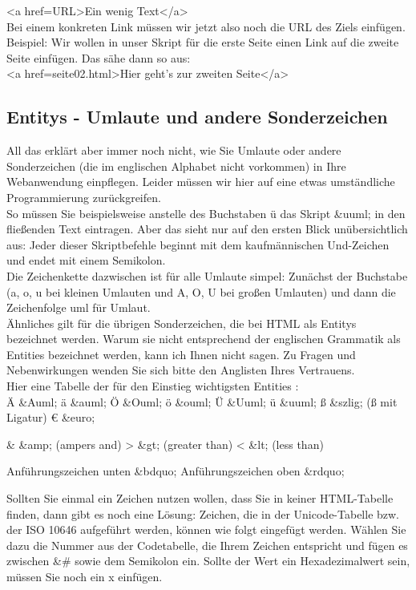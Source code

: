 <a href=URL>Ein wenig Text</a>\\

Bei einem konkreten Link müssen wir jetzt also noch die URL des Ziels einfügen.
Beispiel: Wir wollen in unser Skript für die erste Seite einen Link auf die zweite Seite einfügen. Das sähe dann so aus:\\

<a href=seite02.html>Hier geht’s zur zweiten Seite</a>

\subsection{Entitys - Umlaute und andere Sonderzeichen}

All das erklärt aber immer noch nicht, wie Sie Umlaute oder andere Sonderzeichen (die im englischen Alphabet nicht vorkommen) in Ihre Webanwendung einpflegen. Leider müssen wir hier auf eine etwas umständliche Programmierung zurückgreifen.\\

So müssen Sie beispielsweise anstelle des Buchstaben ü das Skript \&uuml; in den fließenden Text eintragen. Aber das sieht nur auf den ersten Blick unübersichtlich aus: Jeder dieser Skriptbefehle beginnt mit dem kaufmännischen Und-Zeichen und endet mit einem Semikolon.\\

Die Zeichenkette dazwischen ist für alle Umlaute simpel: Zunächst der Buchstabe (a, o, u bei kleinen Umlauten und A, O, U bei großen Umlauten) und dann die Zeichenfolge uml für Umlaut.\\

Ähnliches gilt für die übrigen Sonderzeichen, die bei HTML als Entitys bezeichnet werden. Warum sie nicht entsprechend der englischen Grammatik als Entities bezeichnet werden, kann ich Ihnen nicht sagen. Zu Fragen und Nebenwirkungen wenden Sie sich bitte den Anglisten Ihres Vertrauens.\\

Hier eine Tabelle der für den Einstieg wichtigsten Entities :\\

Ä	\&Auml;	
ä	\&auml;	
Ö	\&Ouml;	
ö	\&ouml;	
Ü	\&Uuml;	
ü	\&uuml;	
ß	\&szlig;	(ß mit Ligatur)
€	\&euro;	

\&	\&amp;	(ampers and)
>	\&gt;	(greater than)
<	\&lt;	(less than)

Anführungszeichen unten	\&bdquo;	
Anführungszeichen oben	\&rdquo;	

Sollten Sie einmal ein Zeichen nutzen wollen, dass Sie in keiner HTML-Tabelle finden, dann gibt es noch eine Lösung: Zeichen, die in der Unicode-Tabelle bzw. der ISO 10646  aufgeführt werden, können wie folgt eingefügt werden. Wählen Sie dazu die Nummer aus der Codetabelle, die Ihrem Zeichen entspricht und fügen es zwischen \&\# sowie dem Semikolon ein. Sollte der Wert ein Hexadezimalwert sein, müssen Sie noch ein x einfügen.\\

